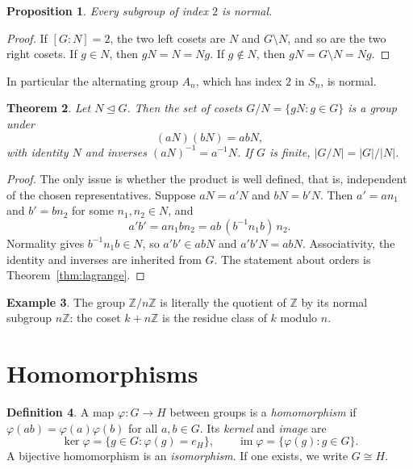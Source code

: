 \documentclass[11pt]{article}
\theoremstyle{plain}
\newtheorem{theorem}{Theorem}[section]
\newtheorem{proposition}[theorem]{Proposition}
\theoremstyle{definition}
\newtheorem{definition}[theorem]{Definition}
\newtheorem{example}[theorem]{Example}
\theoremstyle{remark}
\newcommand{\Z}{\mathbb{Z}}
\DeclareMathOperator{\im}{im}
\begin{document}
\begin{proposition}\label{prop:index-two}
Every subgroup of index $2$ is normal.
\end{proposition}

\begin{proof}
If $[G : N] = 2$, the two left cosets are $N$ and $G \setminus N$, and so are the two right cosets. If $g \in N$, then $gN = N = Ng$. If $g \notin N$, then $gN = G \setminus N = Ng$.
\end{proof}

In particular the alternating group $A_n$, which has index $2$ in $S_n$, is normal.

\begin{theorem}\label{thm:quotient}
Let $N \trianglelefteq G$. Then the set of cosets $G/N = \{gN : g \in G\}$ is a group under
\[
  (aN)(bN) = abN,
\]
with identity $N$ and inverses $(aN)^{-1} = a^{-1}N$. If $G$ is finite, $|G/N| = |G|/|N|$.
\end{theorem}

\begin{proof}
The only issue is whether the product is well defined, that is, independent of the chosen representatives. Suppose $aN = a'N$ and $bN = b'N$. Then $a' = an_1$ and $b' = bn_2$ for some $n_1, n_2 \in N$, and
\[
  a'b' = a n_1 b n_2 = ab\,(b^{-1} n_1 b)\, n_2.
\]
Normality gives $b^{-1}n_1b \in N$, so $a'b' \in abN$ and $a'b'N = abN$. Associativity, the identity and inverses are inherited from $G$. The statement about orders is Theorem~\ref{thm:lagrange}.
\end{proof}

\begin{example}
The group $\Z/n\Z$ is literally the quotient of $\Z$ by its normal subgroup $n\Z$: the coset $k + n\Z$ is the residue class of $k$ modulo $n$.
\end{example}

\section{Homomorphisms}

\begin{definition}
A map $\varphi\colon G \to H$ between groups is a \emph{homomorphism} if $\varphi(ab) = \varphi(a)\varphi(b)$ for all $a, b \in G$. Its \emph{kernel} and \emph{image} are
\[
  \ker\varphi = \{g \in G : \varphi(g) = e_H\}, \qquad \im\varphi = \{\varphi(g) : g \in G\}.
\]
A bijective homomorphism is an \emph{isomorphism}. If one exists, we write $G \cong H$.
\end{definition}
\end{document}

